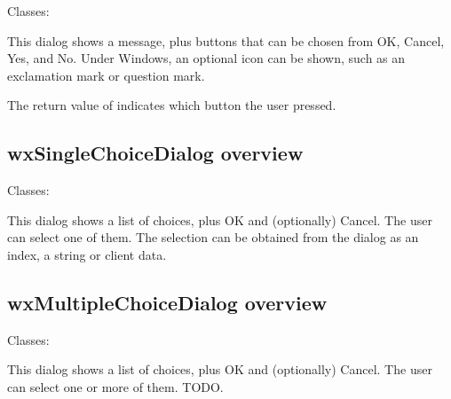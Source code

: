 Classes: 

This dialog shows a message, plus buttons that can be chosen from OK, Cancel, Yes, and No.
Under Windows, an optional icon can be shown, such as an exclamation mark or question mark.

The return value of  indicates
which button the user pressed.

\subsection{wxSingleChoiceDialog overview}\label{wxsinglechoicedialogoverview}

Classes: 

This dialog shows a list of choices, plus OK and (optionally) Cancel. The user can
select one of them. The selection can be obtained from the dialog as an index,
a string or client data.

\subsection{wxMultipleChoiceDialog overview}\label{wxmultiplechoicedialogoverview}

Classes: 

This dialog shows a list of choices, plus OK and (optionally) Cancel. The user can
select one or more of them. TODO.

